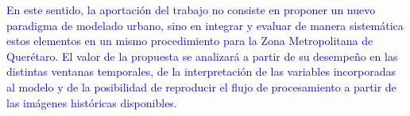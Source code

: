 \textcolor{blue}{En este sentido, la aportación del trabajo no consiste en
proponer un nuevo paradigma de modelado urbano, sino en integrar y evaluar de
manera sistemática estos elementos en un mismo procedimiento para la Zona
Metropolitana de Querétaro. El valor de la propuesta se analizará a partir de
su desempeño en las distintas ventanas temporales, de la interpretación de las
variables incorporadas al modelo y de la posibilidad de reproducir el flujo
de procesamiento a partir de las imágenes históricas disponibles.}

%
